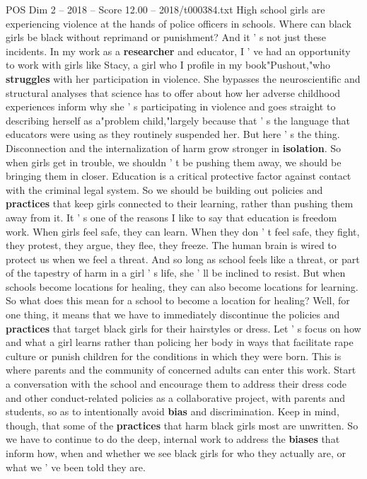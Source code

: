 \begin{textsample}{POS Dim 2 – 2018 – Score 12.00 – 2018/t000384.txt}
High school girls are experiencing violence at the hands of police officers in schools.
Where can black girls be black without reprimand or punishment?
And it ' s not just these incidents.
In my work as a \textbf{researcher} and educator, I ' ve had an opportunity to work with girls like Stacy, a girl who I profile in my book"Pushout,"who \textbf{struggles} with her participation in violence.
She bypasses the neuroscientific and structural analyses that science has to offer about how her adverse childhood experiences inform why she ' s participating in violence and goes straight to describing herself as a"problem child,"largely because that ' s the language that educators were using as they routinely suspended her.
But here ' s the thing.
Disconnection and the internalization of harm grow stronger in \textbf{isolation}.
So when girls get in trouble, we shouldn ' t be pushing them away, we should be bringing them in closer.
Education is a critical protective factor against contact with the criminal legal system.
So we should be building out policies and \textbf{practices} that keep girls connected to their learning, rather than pushing them away from it.
It ' s one of the reasons I like to say that education is freedom work.
When girls feel safe, they can learn.
When they don ' t feel safe, they fight, they protest, they argue, they flee, they freeze.
The human brain is wired to protect us when we feel a threat.
And so long as school feels like a threat, or part of the tapestry of harm in a girl ' s life, she ' ll be inclined to resist.
But when schools become locations for healing, they can also become locations for learning.
So what does this mean for a school to become a location for healing?
Well, for one thing, it means that we have to immediately discontinue the policies and \textbf{practices} that target black girls for their hairstyles or dress.
Let ' s focus on how and what a girl learns rather than policing her body in ways that facilitate rape culture or punish children for the conditions in which they were born.
This is where parents and the community of concerned adults can enter this work.
Start a conversation with the school and encourage them to address their dress code and other conduct-related policies as a collaborative project, with parents and students, so as to intentionally avoid \textbf{bias} and discrimination.
Keep in mind, though, that some of the \textbf{practices} that harm black girls most are unwritten.
So we have to continue to do the deep, internal work to address the \textbf{biases} that inform how, when and whether we see black girls for who they actually are, or what we ' ve been told they are.

\end{textsample}
